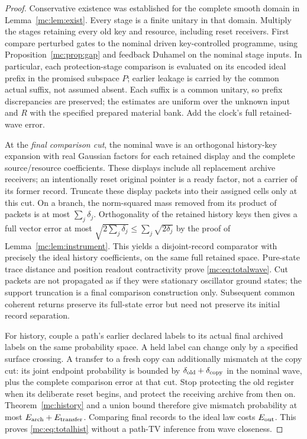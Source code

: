\documentclass[11pt,oneside,openany]{book}
\theoremstyle{definition}
\theoremstyle{remark}\newtheorem{remark}[theorem]{Remark}
\begin{document}
\begin{proof}
Conservative existence was established for the complete smooth domain in Lemma~\ref{mc:lem:exist}. Every stage is a finite unitary in that domain. Multiply the stages retaining every old key and resource, including reset receivers. First compare perturbed gates to the nominal driven key-controlled programme, using Proposition~\ref{mc:prop:gap} and feedback Duhamel on the nominal stage inputs. In particular, each protection-stage comparison is evaluated on its encoded ideal prefix in the promised subspace $P$; earlier leakage is carried by the common actual suffix, not assumed absent. Each suffix is a common unitary, so prefix discrepancies are preserved; the estimates are uniform over the unknown input and $R$ with the specified prepared material bank. Add the clock's full retained-wave error.

At the \emph{final comparison cut}, the nominal wave is an orthogonal history-key expansion with real Gaussian factors for each retained display and the complete source/resource coefficients. These displays include all replacement archive receivers; an intentionally reset original pointer is a ready factor, not a carrier of its former record. Truncate these display packets into their assigned cells only at this cut. On a branch, the norm-squared mass removed from its product of packets is at most $\sum_j\delta_j$. Orthogonality of the retained history keys then gives a full vector error at most $\sqrt{2\sum_j\delta_j}\le\sum_j\sqrt{2\delta_j}$ by the proof of Lemma~\ref{mc:lem:instrument}. This yields a disjoint-record comparator with precisely the ideal history coefficients, on the same full retained space. Pure-state trace distance and position readout contractivity prove \eqref{mc:eq:totalwave}. Cut packets are not propagated as if they were stationary oscillator ground states; the support truncation is a final comparison construction only. Subsequent common coherent returns preserve its full-state error but need not preserve its initial record separation.

For history, couple a path's earlier declared labels to its actual final archived labels on the same probability space. A held label can change only by a specified surface crossing. A transfer to a fresh copy can additionally mismatch at the copy cut: its joint endpoint probability is bounded by $\delta_{\rm old}+\delta_{\rm copy}$ in the nominal wave, plus the complete comparison error at that cut. Stop protecting the old register when its deliberate reset begins, and protect the receiving archive from then on. Theorem~\ref{mc:history} and a union bound therefore give mismatch probability at most $E_{\rm arch}+E_{\rm transfer}$. Comparing final records to the ideal law costs $E_{\rm out}$. This proves \eqref{mc:eq:totalhist} without a path-TV inference from wave closeness.


\end{proof}
\end{document}
